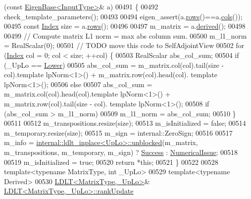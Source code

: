 \begin{DoxyCode}
      (\textcolor{keyword}{const} \hyperlink{group___core___module_struct_eigen_1_1_eigen_base}{EigenBase<InputType>}& a)
00491 \{
00492   check\_template\_parameters();
00493 
00494   eigen\_assert(a.\hyperlink{group___core___module_a8141320ba8df384426c298b32b000d8e}{rows}()==a.\hyperlink{group___core___module_a7b0b45c7351847696c911ce8aa2abbdb}{cols}());
00495   \textcolor{keyword}{const} \hyperlink{group___cholesky___module_ad9c57eb2fb3bbccd51b9d2e111bea355}{Index} size = a.\hyperlink{group___core___module_a8141320ba8df384426c298b32b000d8e}{rows}();
00496 
00497   m\_matrix = a.\hyperlink{group___core___module_a324b16961a11d2ecfd2d1b7dd7946545}{derived}();
00498 
00499   \textcolor{comment}{// Compute matrix L1 norm = max abs column sum.}
00500   m\_l1\_norm = RealScalar(0);
00501   \textcolor{comment}{// TODO move this code to SelfAdjointView}
00502   \textcolor{keywordflow}{for} (\hyperlink{group___cholesky___module_ad9c57eb2fb3bbccd51b9d2e111bea355}{Index} col = 0; col < size; ++col) \{
00503     RealScalar abs\_col\_sum;
00504     \textcolor{keywordflow}{if} (\_UpLo == \hyperlink{group__enums_gga39e3366ff5554d731e7dc8bb642f83cda891792b8ed394f7607ab16dd716f60e6}{Lower})
00505       abs\_col\_sum = m\_matrix.col(col).tail(size - col).template lpNorm<1>() + m\_matrix.row(col).head(col).
      template lpNorm<1>();
00506     \textcolor{keywordflow}{else}
00507       abs\_col\_sum = m\_matrix.col(col).head(col).template lpNorm<1>() + m\_matrix.row(col).tail(size - col).
      template lpNorm<1>();
00508     \textcolor{keywordflow}{if} (abs\_col\_sum > m\_l1\_norm)
00509       m\_l1\_norm = abs\_col\_sum;
00510   \}
00511 
00512   m\_transpositions.resize(size);
00513   m\_isInitialized = \textcolor{keyword}{false};
00514   m\_temporary.resize(size);
00515   m\_sign = internal::ZeroSign;
00516 
00517   m\_info = \hyperlink{struct_eigen_1_1internal_1_1ldlt__inplace}{internal::ldlt\_inplace<UpLo>::unblocked}(m\_matrix, 
      m\_transpositions, m\_temporary, m\_sign) ? \hyperlink{group__enums_gga85fad7b87587764e5cf6b513a9e0ee5ea52581b035f4b59c203b8ff999ef5fcea}{Success} : \hyperlink{group__enums_gga85fad7b87587764e5cf6b513a9e0ee5eaaf9b736d310a664e7729d163a035cc5f}{NumericalIssue};
00518 
00519   m\_isInitialized = \textcolor{keyword}{true};
00520   \textcolor{keywordflow}{return} *\textcolor{keyword}{this};
00521 \}
00522 
00528 \textcolor{keyword}{template}<\textcolor{keyword}{typename} MatrixType, \textcolor{keywordtype}{int} \_UpLo>
00529 \textcolor{keyword}{template}<\textcolor{keyword}{typename} Derived>
00530 \hyperlink{group___cholesky___module_class_eigen_1_1_l_d_l_t}{LDLT<MatrixType,\_UpLo>}& \hyperlink{group___cholesky___module_class_eigen_1_1_l_d_l_t}{LDLT<MatrixType,\_UpLo>::rankUpdate}

\end{DoxyCode}
